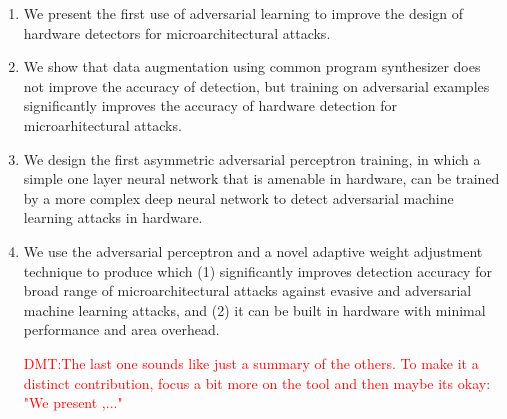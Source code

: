 \begin{enumerate}
\item We present the first use of adversarial learning to improve the
design of hardware detectors for microarchitectural attacks. 
\vspace{2mm}

\item We show that data augmentation using common program synthesizer does not improve the accuracy of detection, but training on adversarial examples significantly improves the accuracy of hardware detection for microarhitectural attacks. 

\item We design the first asymmetric  adversarial perceptron training, in which a simple one layer neural network that is amenable in hardware, can be trained  by a more complex deep neural network to detect adversarial machine learning attacks in hardware.


\item We use the adversarial perceptron and a novel adaptive weight adjustment technique to produce \scheme{} which (1) significantly improves detection accuracy for broad range of microarchitectural attacks against evasive and adversarial machine learning attacks, and (2) it can be built in hardware with minimal performance and area overhead. 

\textcolor{red}{DMT:The last one sounds like just a summary of the others.  To make it a distinct 
contribution, focus a bit more on the tool and then maybe its okay:  "We present \scheme{},..."}
\end{enumerate}
 